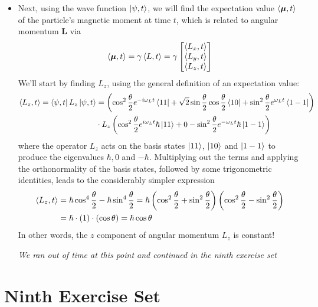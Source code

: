 \documentclass[11pt, a4paper]{article}
\renewcommand{\vec}[1]{\bm{#1}} %
\newcommand{\m}{\vec{\mu}}  %
\begin{document}
\begin{itemize}
	\item Next, using the wave function $ \ket{\psi, t} $, we will find the expectation value $ \ev{\m, t} $ of the particle's magnetic moment at time $ t $, which is related to angular momentum $ \vec{L} $ via
	\begin{equation*}
		\ev{\m, t} = \gamma \ev{L, t} = \gamma
		\begin{bmatrix}
			\ev{L_{x}, t}\\
			\ev{L_{y}, t}\\
			\ev{L_{z}, t}
		\end{bmatrix}
	\end{equation*}
	We'll start by finding $ L_{z} $, using the general definition of an expectation value:
	\begin{align*}
		\ev{L_{z}, t} = \bra{\psi, t}L_{z}\ket{\psi, t} &= \left(\cos^{2} \frac{\theta}{2} e^{-i \omega_{L} t}\bra{11} + \sqrt{2}\sin \frac{\theta}{2} \cos \frac{\theta}{2} \bra{10} + \sin^{2}\frac{\theta}{2} e^{\omega_{L} t}\bra{1 -1}\right) \\
		&\cdot L_{z}\left(\cos^{2} \frac{\theta}{2} e^{i \omega_{L} t}\hbar\ket{11} + 0 - \sin^{2}\frac{\theta}{2} e^{-\omega_{L} t}\hbar\ket{1 -1}\right)
	\end{align*}
	where the operator $ L_{z} $ acts on the basis states $ \ket{11} $, $ \ket{10} $ and $ \ket{1-1} $ to produce the eigenvalues $ \hbar, 0 $ and $ -\hbar $. Multiplying out the terms and applying the orthonormality of the basis states, followed by some trigonometric identities, leads to the considerably simpler expression
	\begin{align*}
		\ev{L_{z}, t} &= \hbar \cos^{4}\frac{\theta}{2} - \hbar \sin^{4}\frac{\theta}{2} = \hbar\left(\cos^{2}\frac{\theta}{2} +  \sin^{2}\frac{\theta}{2}\right)\left(\cos^{2}\frac{\theta}{2} -  \sin^{2}\frac{\theta}{2}\right)\\
		&=\hbar\cdot (1) \cdot (\cos \theta) = \hbar \cos \theta
	\end{align*}
	In other words, the $ z $ component of angular momentum $ L_{z} $ is constant!
	
	\textit{We ran out of time at this point and continued in the ninth exercise set}
	
\end{itemize}

\section{Ninth Exercise Set}
\end{document}
